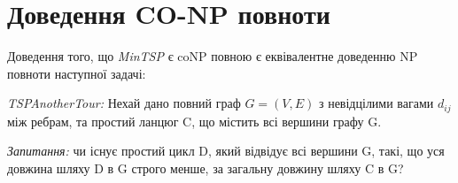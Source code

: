\chapter{Доведення CO-NP повноти}
\label{chap:theory}

Доведення того, що \emph{MinTSP} є coNP повною є еквівалентне доведенню
NP повноти наступної задачі:
\begin{definition}
    \emph{TSPAnotherTour: } Нехай дано повний граф $G = (V, E)$ з невід цілими вагами
$d_{ij}$ між ребрам, та простий ланцюг C, що містить всі вершини графу G.
\par\emph{Запитання: } чи існує простий цикл D, який відвідує всі вершини G, такі, що уся
довжина шляху D в G строго менше, за загальну довжину шляху C в G?
\end{definition}

